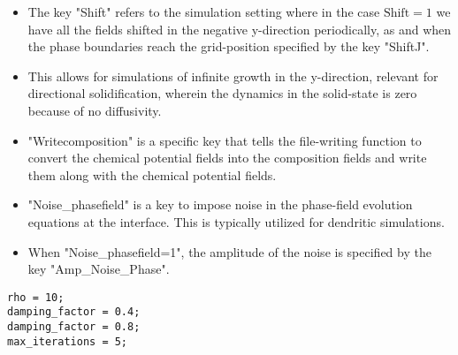\documentclass[a4paper,10pt]{article}
\begin{document}
\begin{itemize}
 \item The key "Shift" refers to the simulation setting where in the case $\textrm{Shift}=1$ we have all the fields shifted in the negative y-direction
 periodically, as and when the phase boundaries reach the grid-position specified by the key "ShiftJ".
 \item This allows for simulations of infinite growth in the y-direction, relevant for directional solidification, wherein the dynamics in the solid-state
 is zero because of no diffusivity.
 \item "Writecomposition" is a specific key that tells the file-writing function to convert the chemical potential fields into the composition fields and write 
 them along with the chemical potential fields.
 \item "Noise\_phasefield" is a key to impose noise in the phase-field evolution equations at the interface. This is typically utilized for dendritic simulations.
 \item When "Noise\_phasefield=1", the amplitude of the noise is specified by the key "Amp\_Noise\_Phase".
\end{itemize}

\begin{lstlisting}
rho = 10;
damping_factor = 0.4;
damping_factor = 0.8;
max_iterations = 5;
\end{lstlisting}
\end{document}
